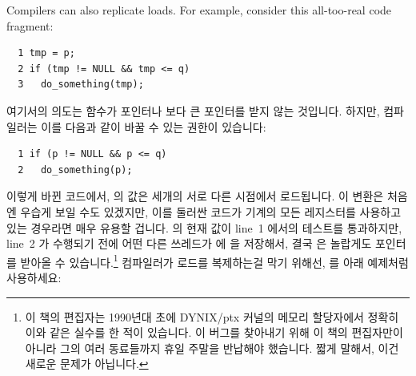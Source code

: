 Compilers can also replicate loads.
For example, consider this all-too-real code fragment:
\fi

\vspace{5pt}
\begin{minipage}[t]{\columnwidth}
\scriptsize
\begin{verbatim}
  1 tmp = p;
  2 if (tmp != NULL && tmp <= q)
  3   do_something(tmp);
\end{verbatim}
\end{minipage}
\vspace{5pt}

여기서의 의도는  함수가  포인터나  보다 큰
포인터를 받지 않는 것입니다.
하지만, 컴파일러는 이를 다음과 같이 바꿀 수 있는 권한이 있습니다:

\vspace{5pt}
\begin{minipage}[t]{\columnwidth}
\scriptsize
\begin{verbatim}
  1 if (p != NULL && p <= q)
  2   do_something(p);
\end{verbatim}
\end{minipage}
\vspace{5pt}

이렇게 바뀐 코드에서,  의 값은 세개의 서로 다른 시점에서 로드됩니다.
이 변환은 처음엔 우습게 보일 수도 있겠지만, 이를 둘러싼 코드가 기계의 모든
레지스터를 사용하고 있는 경우라면 매우 유용할 겁니다.
 의 현재 값이 line~1 에서의 테스트를 통과하지만, line~2 가 수행되기 전에
어떤 다른 쓰레드가  에  을 저장해서, 결국  은
놀랍게도  포인터를 받아올 수 있습니다.\footnote{
	이 책의 편집자는 1990년대 초에 DYNIX/ptx 커널의 메모리 할당자에서
	정확히 이와 같은 실수를 한 적이 있습니다.
	이 버그를 찾아내기 위해 이 책의 편집자만이 아니라 그의 여러 동료들까지
	휴일 주말을 반납해야 했습니다.
	짧게 말해서, 이건 새로운 문제가 아닙니다.}
컴파일러가 로드를 복제하는걸 막기 위해선,  를 아래 예제처럼
사용하세요:

